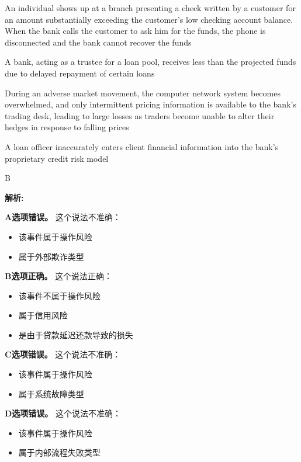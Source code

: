 \documentclass{article}
\newenvironment{explanation}
{\textbf{解析:}\par}
{\par}
\begin{document}
\begin{choices}
    \item An individual shows up at a branch presenting a check written by a customer for an amount substantially exceeding the customer's low checking account balance. When the bank calls the customer to ask him for the funds, the phone is disconnected and the bank cannot recover the funds
    \item A bank, acting as a trustee for a loan pool, receives less than the projected funds due to delayed repayment of certain loans
    \item During an adverse market movement, the computer network system becomes overwhelmed, and only intermittent pricing information is available to the bank's trading desk, leading to large losses as traders become unable to alter their hedges in response to falling prices
    \item A loan officer inaccurately enters client financial information into the bank's proprietary credit risk model
\end{choices}

\begin{correctanswer}
    B
\end{correctanswer}

\begin{explanation}
    \textbf{A选项错误。}
    这个说法不准确：
    \begin{itemize}
        \item 该事件属于操作风险
        \item 属于外部欺诈类型
    \end{itemize}

    \textbf{B选项正确。}
    这个说法正确：
    \begin{itemize}
        \item 该事件不属于操作风险
        \item 属于信用风险
        \item 是由于贷款延迟还款导致的损失
    \end{itemize}

    \textbf{C选项错误。}
    这个说法不准确：
    \begin{itemize}
        \item 该事件属于操作风险
        \item 属于系统故障类型
    \end{itemize}

    \textbf{D选项错误。}
    这个说法不准确：
    \begin{itemize}
        \item 该事件属于操作风险
        \item 属于内部流程失败类型
    \end{itemize}
\end{explanation}
\end{document}
